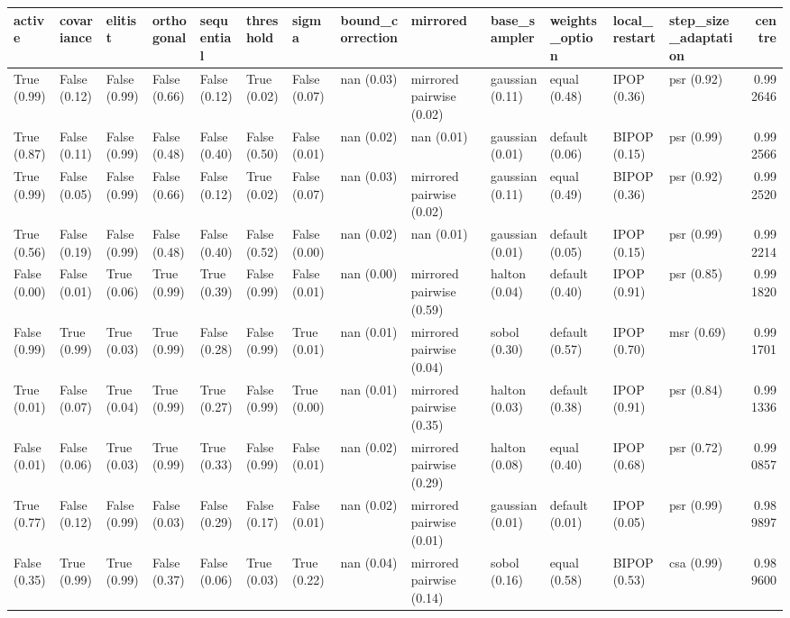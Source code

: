 \begin{tabular}{lllllllllllllr}
\toprule
active & covariance & elitist & orthogonal & sequential & threshold & sigma & bound_correction & mirrored & base_sampler & weights_option & local_restart & step_size_adaptation & centre \\
\midrule
True (0.99) & False (0.12) & False (0.99) & False (0.66) & False (0.12) & True (0.02) & False (0.07) & nan (0.03) & mirrored pairwise (0.02) & gaussian (0.11) & equal (0.48) & IPOP (0.36) & psr (0.92) & 0.992646 \\
True (0.87) & False (0.11) & False (0.99) & False (0.48) & False (0.40) & False (0.50) & False (0.01) & nan (0.02) & nan (0.01) & gaussian (0.01) & default (0.06) & BIPOP (0.15) & psr (0.99) & 0.992566 \\
True (0.99) & False (0.05) & False (0.99) & False (0.66) & False (0.12) & True (0.02) & False (0.07) & nan (0.03) & mirrored pairwise (0.02) & gaussian (0.11) & equal (0.49) & BIPOP (0.36) & psr (0.92) & 0.992520 \\
True (0.56) & False (0.19) & False (0.99) & False (0.48) & False (0.40) & False (0.52) & False (0.00) & nan (0.02) & nan (0.01) & gaussian (0.01) & default (0.05) & IPOP (0.15) & psr (0.99) & 0.992214 \\
False (0.00) & False (0.01) & True (0.06) & True (0.99) & True (0.39) & False (0.99) & False (0.01) & nan (0.00) & mirrored pairwise (0.59) & halton (0.04) & default (0.40) & IPOP (0.91) & psr (0.85) & 0.991820 \\
False (0.99) & True (0.99) & True (0.03) & True (0.99) & False (0.28) & False (0.99) & True (0.01) & nan (0.01) & mirrored pairwise (0.04) & sobol (0.30) & default (0.57) & IPOP (0.70) & msr (0.69) & 0.991701 \\
True (0.01) & False (0.07) & True (0.04) & True (0.99) & True (0.27) & False (0.99) & True (0.00) & nan (0.01) & mirrored pairwise (0.35) & halton (0.03) & default (0.38) & IPOP (0.91) & psr (0.84) & 0.991336 \\
False (0.01) & False (0.06) & True (0.03) & True (0.99) & True (0.33) & False (0.99) & False (0.01) & nan (0.02) & mirrored pairwise (0.29) & halton (0.08) & equal (0.40) & IPOP (0.68) & psr (0.72) & 0.990857 \\
True (0.77) & False (0.12) & False (0.99) & False (0.03) & False (0.29) & False (0.17) & False (0.01) & nan (0.02) & mirrored pairwise (0.01) & gaussian (0.01) & default (0.01) & IPOP (0.05) & psr (0.99) & 0.989897 \\
False (0.35) & True (0.99) & True (0.99) & False (0.37) & False (0.06) & True (0.03) & True (0.22) & nan (0.04) & mirrored pairwise (0.14) & sobol (0.16) & equal (0.58) & BIPOP (0.53) & csa (0.99) & 0.989600 \\

\end{tabular}
